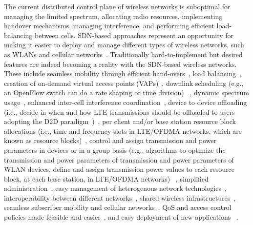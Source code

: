 The current distributed control plane of wireless networks is suboptimal for managing the limited 
spectrum, allocating radio resources, implementing handover mechanisms, managing interference, and performing efficient load-balancing between cells.
SDN-based approaches represent an opportunity for making it easier to deploy and manage different types of wireless networks, such as WLANs and cellular 
networks~\cite{suresh2012,yap2010-1,ali-ahmad2013,gudipati2013,li2012,jin2013}.
Traditionally hard-to-implement but desired features are indeed becoming a reality with the SDN-based wireless networks. 
These include seamless mobility through efficient hand-overs~\cite{suresh2012,dely2011,li2012}, load balancing~\cite{suresh2012,gudipati2013}, creation of on-demand virtual access points (VAPs)~\cite{suresh2012,vestin2013}, downlink scheduling (e.g., an OpenFlow switch can do a rate shaping or time division) ~\cite{vestin2013}, dynamic spectrum usage~\cite{vestin2013}, enhanced inter-cell 
interference coordination~\cite{vestin2013,li2012}, device to device offloading (i.e., decide in when and how LTE transmissions should be offloaded to users adopting the D2D paradigm~\cite{yang2013d2d})~\cite{ali-ahmad2013}, per client and/or base station resource block allocations (i.e.,  time and frequency slots in LTE/OFDMA networks, which are known as resource blocks)~\cite{gudipati2013,ali-ahmad2013,jin2013}, control and assign 
transmission and power parameters in devices or in a group basis (e.g., algorithms to optimize the transmission and power parameters of
transmission and power parameters of WLAN devices, define and assign transmission power values to each resource block, at each base station, in LTE/OFDMA networks) ~\cite{ali-ahmad2013,gudipati2013}, simplified administration~\cite{suresh2012,yap2010-1,gudipati2013}, easy management of heterogenous network technologies~\cite{yap2010-1,gudipati2013,yap2010-2}, interoperability between different networks~\cite{yap2010-2,jin2013}, shared wireless infrastructures~\cite{yap2010-2}, seamless subscriber mobility and cellular networks~\cite{li2012}, QoS and access control policies made feasible and easier~\cite{li2012,jin2013}, and easy deployment of new applications 
~\cite{suresh2012,gudipati2013,yap2010-2}. 

